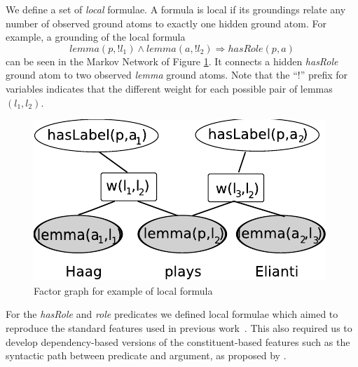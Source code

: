 


We define a set of \emph{local} formulae. A formula is local if its groundings relate any number of observed ground atoms to exactly one hidden ground atom. For example, a grounding of the local formula 
\[lemma(p,!l_1) \wedge lemma(a,!l_2) \Rightarrow hasRole(p,a)\]
can be seen in the Markov Network of Figure \ref{fig:local2}. It connects a hidden \emph{hasRole} ground atom to two observed \emph{lemma} ground atoms. Note that the ``!'' prefix for variables indicates that the different weight for each possible pair of lemmas $(l_1,l_2)$.


\begin{figure}
\begin{center}
    \includegraphics[scale=.70]{LocalFormula2}
\end{center}
\caption{Factor graph for example of local formula}
\label{fig:local2}
\end{figure}

For the \emph{hasRole} and \emph{role} predicates we defined local formulae which aimed to reproduce the standard features used in previous work~\citep{xue04calibrating}. This also required us to develop dependency-based versions of the constituent-based features such as the syntactic path between predicate and argument, as proposed by \cite{xue04calibrating}. 

